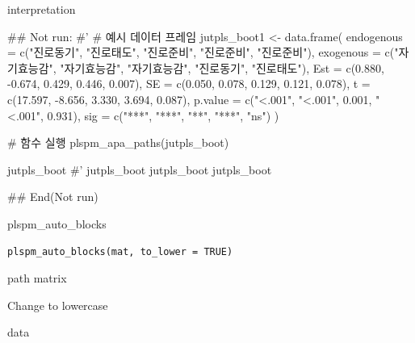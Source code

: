 \documentclass[a4paper]{book}
\begin{document}
%
\begin{Value}
interpretation
\end{Value}
%
\begin{Examples}
\begin{ExampleCode}

\#\# Not run: 
#'
# 예시 데이터 프레임
jutpls_boot1 <- data.frame(
  endogenous = c("진로동기", "진로태도", "진로준비", "진로준비", "진로준비"),
  exogenous = c("자기효능감", "자기효능감", "자기효능감", "진로동기", "진로태도"),
  Est = c(0.880, -0.674, 0.429, 0.446, 0.007),
  SE = c(0.050, 0.078, 0.129, 0.121, 0.078),
  t = c(17.597, -8.656, 3.330, 3.694, 0.087),
  p.value = c("<.001", "<.001", 0.001, "<.001", 0.931),
  sig = c("***", "***", "**", "***", "ns")
)

# 함수 실행
plspm_apa_paths(jutpls_boot)

jutpls_boot %
#'
jutpls_boot %
jutpls_boot %
jutpls_boot %



## End(Not run)

\end{ExampleCode}
\end{Examples}
%
\begin{Description}
plspm\_auto\_blocks
\end{Description}
%
\begin{Usage}
\begin{verbatim}
plspm_auto_blocks(mat, to_lower = TRUE)
\end{verbatim}
\end{Usage}
%
\begin{Arguments}
\begin{ldescription}
\item[\code{mat}] path matrix

\item[\code{to\_lower}] Change to lowercase
\end{ldescription}
\end{Arguments}
%
\begin{Value}
data
\end{Value}
%
\end{document}
